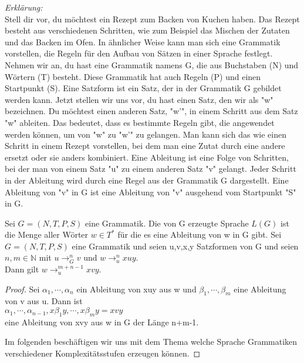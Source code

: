     \textit{Erklärung:}\\
    Stell dir vor, du möchtest ein Rezept zum Backen von Kuchen haben. Das Rezept besteht aus verschiedenen Schritten, wie zum Beispiel das Mischen der Zutaten und das Backen im Ofen. In ähnlicher Weise kann man sich eine Grammatik vorstellen, die Regeln für den Aufbau von Sätzen in einer Sprache festlegt.
    Nehmen wir an, du hast eine Grammatik namens G, die aus Buchstaben (N) und Wörtern (T) besteht. Diese Grammatik hat auch Regeln (P) und einen Startpunkt (S). Eine Satzform ist ein Satz, der in der Grammatik G gebildet werden kann.
    Jetzt stellen wir uns vor, du hast einen Satz, den wir als "w" bezeichnen. Du möchtest einen anderen Satz, "w'", in einem Schritt aus dem Satz "w" ableiten. Das bedeutet, dass es bestimmte Regeln gibt, die angewendet werden können, um von "w" zu "w'" zu gelangen. Man kann sich das wie einen Schritt in einem Rezept vorstellen, bei dem man eine Zutat durch eine andere ersetzt oder sie anders kombiniert.
    Eine Ableitung ist eine Folge von Schritten, bei der man von einem Satz "u" zu einem anderen Satz "v" gelangt. Jeder Schritt in der Ableitung wird durch eine Regel aus der Grammatik G dargestellt. Eine Ableitung von "v" in G ist eine Ableitung von "v" ausgehend vom Startpunkt "S" in G.
    
    
    Sei \(G=(N,T,P,S)\) eine Grammatik. Die von G erzeugte Sprache \(L(G)\) ist die Menge aller Wörter \(w\in T^*\) für die es eine Ableitung von w in G gibt.
    Sei \(G=(N,T,P,S)\) eine Grammatik und seien u,v,x,y Satzformen von G und seien \(n,m\in\mathbb{N}\) mit \(u\to_G^nv\) und \(w\to_u^nxuy\).\\
    Dann gilt \(w\to_u^{m+n-1}xvy\).
\begin{proof}
    Sei \(\alpha _1,\cdots,\alpha_n\) ein Ableitung von xuy aus w und \(\beta_1,\cdots,\beta_m\) eine Ableitung von v aus u. Dann ist\\ 
    \(\alpha_1,\cdots,\alpha_{n-1},x\beta_1y,\cdots,x\beta_my=xvy\)\\
    eine Ableitung von xvy aus w in G der Länge n+m-1.\par\bigskip
    Im folgenden beschäftigen wir uns mit dem Thema welche Sprache Grammatiken verschiedener Komplexitätsstufen erzeugen können.
\end{proof}

